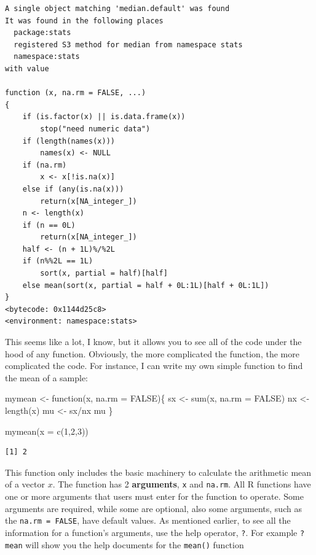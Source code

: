 \documentclass[
  letterpaper,
  DIV=11,
  numbers=noendperiod]{scrreprt}
\newenvironment{Shaded}{\begin{snugshade}}{\end{snugshade}}
\newcommand{\AttributeTok}[1]{\textcolor[rgb]{0.40,0.45,0.13}{#1}}
\newcommand{\ConstantTok}[1]{\textcolor[rgb]{0.56,0.35,0.01}{#1}}
\newcommand{\ControlFlowTok}[1]{\textcolor[rgb]{0.00,0.23,0.31}{#1}}
\newcommand{\DecValTok}[1]{\textcolor[rgb]{0.68,0.00,0.00}{#1}}
\newcommand{\FunctionTok}[1]{\textcolor[rgb]{0.28,0.35,0.67}{#1}}
\newcommand{\NormalTok}[1]{\textcolor[rgb]{0.00,0.23,0.31}{#1}}
\newcommand{\OtherTok}[1]{\textcolor[rgb]{0.00,0.23,0.31}{#1}}
\newcommand{\SpecialCharTok}[1]{\textcolor[rgb]{0.37,0.37,0.37}{#1}}
\begin{document}
\begin{verbatim}
A single object matching 'median.default' was found
It was found in the following places
  package:stats
  registered S3 method for median from namespace stats
  namespace:stats
with value

function (x, na.rm = FALSE, ...) 
{
    if (is.factor(x) || is.data.frame(x)) 
        stop("need numeric data")
    if (length(names(x))) 
        names(x) <- NULL
    if (na.rm) 
        x <- x[!is.na(x)]
    else if (any(is.na(x))) 
        return(x[NA_integer_])
    n <- length(x)
    if (n == 0L) 
        return(x[NA_integer_])
    half <- (n + 1L)%/%2L
    if (n%%2L == 1L) 
        sort(x, partial = half)[half]
    else mean(sort(x, partial = half + 0L:1L)[half + 0L:1L])
}
<bytecode: 0x1144d25c8>
<environment: namespace:stats>
\end{verbatim}

This seems like a lot, I know, but it allows you to see all of the code
under the hood of any function. Obviously, the more complicated the
function, the more complicated the code. For instance, I can write my
own simple function to find the mean of a sample:

\begin{Shaded}
\begin{Highlighting}[]
\NormalTok{mymean }\OtherTok{\textless{}{-}} \ControlFlowTok{function}\NormalTok{(x,}
                   \AttributeTok{na.rm =} \ConstantTok{FALSE}\NormalTok{)\{}
\NormalTok{  sx }\OtherTok{\textless{}{-}} \FunctionTok{sum}\NormalTok{(x, }
            \AttributeTok{na.rm =} \ConstantTok{FALSE}\NormalTok{)}
\NormalTok{  nx }\OtherTok{\textless{}{-}} \FunctionTok{length}\NormalTok{(x)}
\NormalTok{  mu }\OtherTok{\textless{}{-}}\NormalTok{ sx}\SpecialCharTok{/}\NormalTok{nx}
\NormalTok{  mu}
\NormalTok{\}}

\FunctionTok{mymean}\NormalTok{(}\AttributeTok{x =} \FunctionTok{c}\NormalTok{(}\DecValTok{1}\NormalTok{,}\DecValTok{2}\NormalTok{,}\DecValTok{3}\NormalTok{))}
\end{Highlighting}
\end{Shaded}

\begin{verbatim}
[1] 2
\end{verbatim}

This function only includes the basic machinery to calculate the
arithmetic mean of a vector \(x\). The function has 2
\textbf{arguments}, \texttt{x} and \texttt{na.rm}. All R functions have
one or more arguments that users must enter for the function to operate.
Some arguments are required, while some are optional, also some
arguments, such as the \texttt{na.rm\ =\ FALSE}, have default values. As
mentioned earlier, to see all the information for a function's
arguments, use the help operator, \texttt{?}. For example \texttt{?mean}
will show you the help documents for the \texttt{mean()} function
\end{document}
